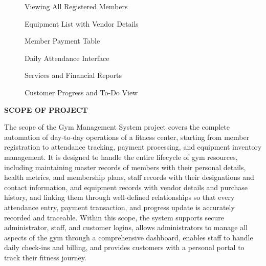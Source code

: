 \documentclass[12pt,a4paper]{report}
\begin{document}
\newpage

\begin{figure}[H]
    \centering
    \caption{Viewing All Registered Members}
\end{figure}

\begin{figure}[H]
    \centering
    \caption{Equipment List with Vendor Details}
\end{figure}

\begin{figure}[H]
    \centering
    \caption{Member Payment Table}
\end{figure}

\newpage

\begin{figure}[H]
    \centering
    \caption{Daily Attendance Interface}
\end{figure}

\begin{figure}[H]
    \centering
    \caption{Services and Financial Reports}
\end{figure}

\begin{figure}[H]
    \centering
    \caption{Customer Progress and To-Do View}
\end{figure}

\newpage
\vspace*{\fill}
\begin{center}
{\LARGE \textbf{SCOPE OF PROJECT}}
\end{center}
\vspace*{\fill}

\newpage
The scope of the Gym Management System project covers the complete automation of day-to-day operations of a fitness center, starting from member registration to attendance tracking, payment processing, and equipment inventory management. It is designed to handle the entire lifecycle of gym resources, including maintaining master records of members with their personal details, health metrics, and membership plans, staff records with their designations and contact information, and equipment records with vendor details and purchase history, and linking them through well-defined relationships so that every attendance entry, payment transaction, and progress update is accurately recorded and traceable. Within this scope, the system supports secure administrator, staff, and customer logins, allows administrators to manage all aspects of the gym through a comprehensive dashboard, enables staff to handle daily check-ins and billing, and provides customers with a personal portal to track their fitness journey.
\end{document}
